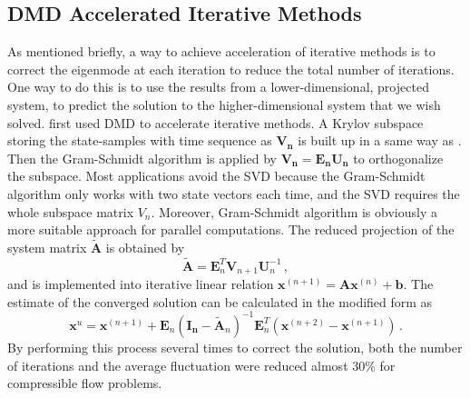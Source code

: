 \subsection{DMD Accelerated Iterative Methods}
As mentioned briefly, a way to achieve acceleration of iterative methods is to correct the eigenmode at each iteration to reduce the total number of iterations.
One way to do this is to use the results from a lower-dimensional, projected system, to predict the solution to the higher-dimensional system that we wish solved.
\citet{andersson_novel} first used DMD to accelerate iterative methods.
A Krylov subspace storing the state-samples with time sequence as $\mathbf{V_n}$ is built up in a same way as .
Then the Gram-Schmidt algorithm is applied by $\mathbf{V_n} = \mathbf{{E_n U_n}}$ to orthogonalize the subspace.
Most applications avoid the SVD because the Gram-Schmidt algorithm only works with two state vectors each time, and the SVD requires the whole subspace matrix $V_n$. 
Moreover, Gram-Schmidt algorithm is obviously a more suitable approach for parallel computations. 
The reduced projection of the system matrix $\mathbf{\tilde{A}}$ is obtained by 
\begin{equation}
 \mathbf{\tilde{A}} = \mathbf{E}_n^T \mathbf{V}_{n+1} \mathbf{U}_n^{-1}  \, ,
 \label{eq:andersson_reduce}
\end{equation}
and is implemented into iterative linear relation $\mathbf{x}^{(n+1)} = \mathbf{A}\mathbf{x}^{(n)} + \mathbf{b}$.
The estimate of the converged solution can be calculated in the modified form as
\begin{equation}
 \mathbf{x}^{u} = \mathbf{x}^{(n+1)} + \mathbf{E}_n(\mathbf{I_n} - \mathbf{\tilde{A}}_n)^{-1} \mathbf{E}_n^T(\mathbf{x}^{(n+2)} - \mathbf{x}^{(n+1)}) \, .
 \label{eq:andersson}
\end{equation}
By performing this process several times to correct the solution, both the number of iterations and the average fluctuation were reduced almost 30\% for compressible flow problems. 


